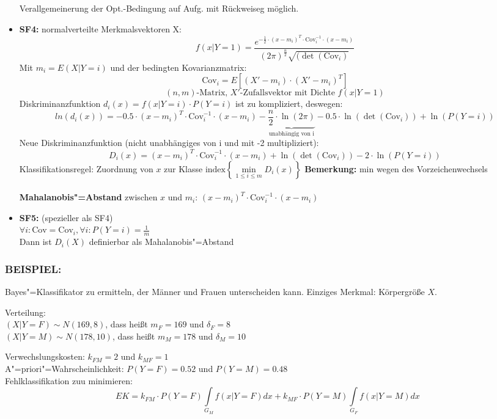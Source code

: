 \documentclass[a4paper,12pt]{scrreprt}
\newcommand{\Nb}[1]{\textbf{#1}}
\newcommand{\itemd}[1]{\item{\textbf{#1}} }
\begin{document}
\begin{itemize}
	Verallgemeinerung der Opt.-Bedingung auf Aufg. mit Rückweiseg möglich.\\
	
	\itemd{SF4:} normalverteilte Merkmalsvektoren X:
		$$f(x|Y=1) = \frac{e^{-\frac{1}{2}\cdot(x-m_i)^T\cdot \text{Cov}_i^{-1}\cdot(x-m_i)}}{(2\pi)^\frac{n}{2}\sqrt{(\det(\text{Cov}_i)}}$$
		Mit $m_i=E(X|Y=i)$ und der bedingten Kovarianzmatrix:
		$$\text{Cov}_i=E{[(X'-m_i)\cdot(X'-m_i)^T]}$$
		$$ (n,m) \text{-Matrix, } X' \text{-Zufallsvektor mit Dichte } f(x|Y=1) $$
		Diskriminanzfunktion  $d_i(x)=f(x|Y=i)\cdot P(Y=i)$ ist zu
		kompliziert, deswegen:
		$$ln(d_i(x))=-0.5\cdot(x-m_i)^T\cdot\text{Cov}_i^{-1}\cdot(x-m_i)-\underbrace{\frac{n}{2}\cdot\ln(2\pi)}_{\text{unabhängig von i}}-0.5\cdot\ln(\det(\text{Cov}_i))+\ln(P(Y=i))$$
		Neue Diskriminanzfunktion (nicht unabhängiges von i und mit -2 multipliziert):
		$$D_i(x)=(x-m_i)^T\cdot\text{Cov}_i^{-1}\cdot(x-m_i)+\ln(\det(\text{Cov}_i))-2\cdot\ln(P(Y=i))$$
		Klassifikationsregel: Zuordnung von $x$ zur Klasse
		$\text{index}\left\{ \min\limits_{1\le i\le m}D_i(x) \right\}$
		\Nb{Bemerkung:} min wegen des Vorzeichenwechsels\\
		\\
		\Nb{Mahalanobis"=Abstand} zwischen $x$ und $m_i$:
		$(x-m_i)^T\cdot\text{Cov}_i^{-1}\cdot(x-m_i)$

	\itemd{SF5:} (spezieller als SF4)\\
		$\forall i: \text{Cov}=\text{Cov}_i, \forall i: P(Y=i)=\frac{1}{m}$
		\\Dann ist $D_i(X)$ definierbar als Mahalanobis"=Abstand
	
\end{itemize}

\subsubsection{BEISPIEL:}
Bayes"=Klassifikator zu ermitteln, der Männer und Frauen
unterscheiden kann. Einziges Merkmal: Körpergröße $X$.

Verteilung:\\ $(X|Y=F)\sim N(169,8)$, dass heißt $m_F=169$ und
$\delta_F=8$\\
$(X|Y=M)\sim N(178,10)$, dass heißt $m_M=178$ und
$\delta_M=10$

Verwechslungskosten: $k_{FM}=2$ und $k_{MF}=1$\\
A"=priori"=Wahrscheinlichkeit:
$P(Y=F)=0.52$ und $P(Y=M)=0.48$\\
Fehlklassifikation zuu minimieren:\\
$$EK=k_{FM}\cdot P(Y=F)\int\limits_{G_M}f(x|Y=F)dx+k_{MF}\cdot
P(Y=M)\int\limits_{G_F}f(x|Y=M)dx$$
\end{document}
